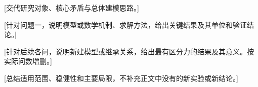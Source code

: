 [交代研究对象、核心矛盾与总体建模思路。]

[针对问题一，说明模型或数学机制、求解方法，给出关键结果及其单位和验证结论。]

[针对后续各问，说明新建模型或继承关系，给出最有区分力的结果及其意义。按实际问数增删。]

[总结适用范围、稳健性和主要局限，不补充正文中没有的新实验或新结论。]
